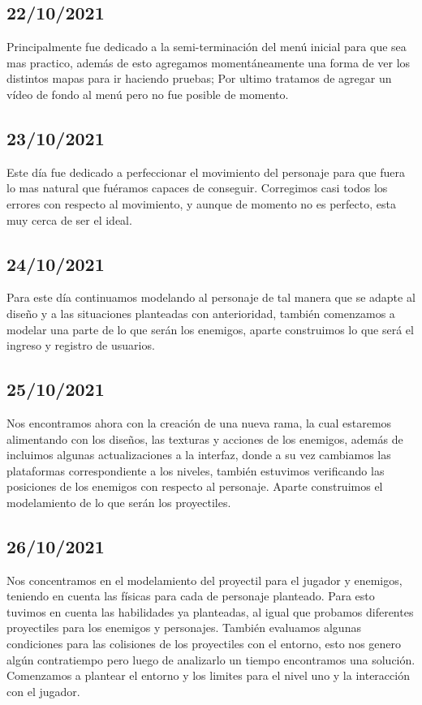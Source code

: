 \documentclass{article}
\begin{document}
    \subsection{22/10/2021}
    Principalmente fue dedicado a la semi-terminación del menú inicial para que sea mas practico, además de esto agregamos momentáneamente una forma de ver los distintos mapas para ir haciendo pruebas; Por ultimo tratamos de agregar un vídeo de fondo al menú pero no fue posible de momento.
    
    \subsection{23/10/2021}
    Este día fue dedicado a perfeccionar el movimiento del personaje para que fuera lo mas natural que fuéramos capaces de conseguir. Corregimos casi todos los errores con respecto al movimiento, y aunque de momento no es perfecto, esta muy cerca de ser el ideal.
    
    \subsection{24/10/2021}
    Para este día continuamos modelando al personaje de tal manera que se adapte al diseño y a las situaciones planteadas con anterioridad, también comenzamos a modelar una parte de lo que serán los enemigos, aparte construimos lo que será el ingreso y registro de usuarios.  
    
    \subsection{25/10/2021}
    Nos encontramos ahora con la creación de una nueva rama, la cual estaremos alimentando con los diseños, las texturas y acciones de los enemigos, además de incluimos algunas actualizaciones a la interfaz, donde a su vez cambiamos las plataformas correspondiente a los niveles, también estuvimos verificando las posiciones de los enemigos con respecto al personaje. Aparte construimos el modelamiento de lo que serán los  proyectiles. 
    
    \subsection{26/10/2021}
    Nos concentramos en el modelamiento del proyectil para el jugador  y enemigos, teniendo en cuenta las físicas para cada de personaje planteado. Para esto tuvimos en cuenta las habilidades ya planteadas, al igual que probamos diferentes proyectiles para los enemigos y personajes. También evaluamos algunas condiciones para las colisiones de los proyectiles con el entorno, esto nos genero algún contratiempo pero luego de analizarlo un tiempo encontramos una solución. Comenzamos a plantear el entorno y los limites para el nivel uno y la interacción con el jugador. 
    
\end{document}
